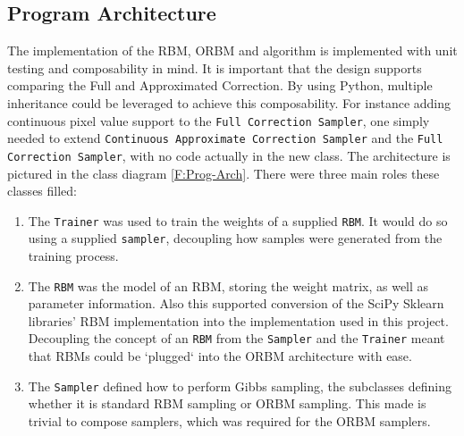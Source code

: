 \subsection{Program Architecture}

The implementation of the RBM, ORBM and algorithm is implemented with unit testing and composability in mind. It is important that the design supports comparing the Full and Approximated Correction. By using Python, multiple inheritance could be leveraged to achieve this composability. For instance  adding continuous pixel value support to the \texttt{Full Correction Sampler}, one simply needed to extend \texttt{Continuous Approximate Correction Sampler} and the  \texttt{Full Correction Sampler}, with no code actually in the new class. The architecture is pictured in the class diagram \ref{F:Prog-Arch}. There were three main roles these classes filled:
\begin{enumerate}
  \item The \texttt{Trainer} was used to train the weights of a supplied \texttt{RBM}. It would do so using a supplied \texttt{sampler}, decoupling how samples were generated from the training process.
  \item The \texttt{RBM} was the model of an RBM, storing the weight matrix, as well as parameter information. Also this supported conversion of the SciPy Sklearn libraries' RBM implementation into the implementation used in this project. Decoupling the concept of an \texttt{RBM} from the \texttt{Sampler} and the \texttt{Trainer} meant that RBMs could be `plugged` into the ORBM architecture with ease.
  \item The \texttt{Sampler} defined how to perform Gibbs sampling, the subclasses defining whether it is standard RBM sampling or ORBM sampling. This made is trivial to compose samplers, which was required for the ORBM samplers.
\end{enumerate}

